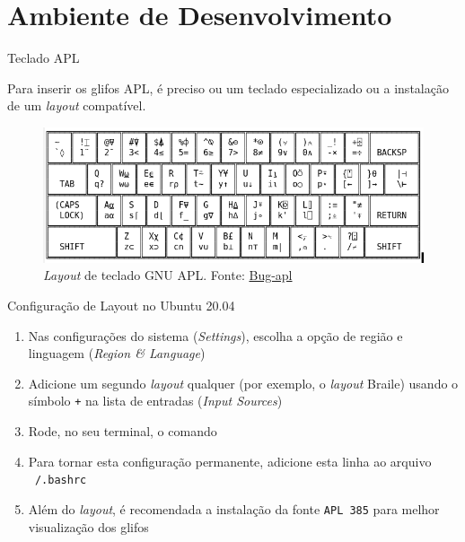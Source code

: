 \section{Ambiente de Desenvolvimento}

\begin{frame}[fragile]{Teclado APL}

    Para inserir os glifos APL, é preciso ou um teclado especializado ou a instalação de um \textit{layout} compatível.
        \pause

    \begin{figure}
        \centering
        \includegraphics[scale=0.5]{figs/keyboard.png}

        \caption{\textit{Layout} de teclado GNU APL. Fonte: \href{https://lists.gnu.org/archive/html/bug-apl/2014-06/msg00261.html}{Bug-apl}}
    \end{figure}

\end{frame}

\begin{frame}[fragile]{Configuração de Layout no Ubuntu 20.04}

    \begin{enumerate}
        \item Nas configurações do sistema (\textit{Settings}), escolha a opção de região e
            linguagem (\textit{Region \& Language})
        \pause

        \item Adicione um segundo \textit{layout} qualquer (por exemplo, o \textit{layout} Braile)
            usando o símbolo \texttt{+} na lista de entradas (\textit{Input Sources})
        \pause

        \item Rode, no seu terminal, o comando

        \pause

        \item Para tornar esta configuração permanente, adicione esta linha ao arquivo
            \texttt{~/.bashrc}
        \pause

        \item Além do \textit{layout}, é recomendada a instalação da fonte \texttt{APL 385} para
            melhor visualização dos glifos
    \end{enumerate}
\end{frame}

